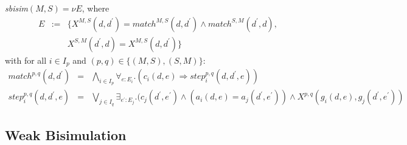 \documentclass{article}
\begin{document}
\emph{sbisim}$(M,S)=\nu E$, where%
\begin{equation*}
\begin{array}{ccl}
E & := & \{X^{M,S}(d,d^{\prime })=match^{M,S}(d,d^{\prime })\wedge
match^{S,M}(d^{\prime },d), \\
&  & X^{S,M}(d^{\prime },d)=X^{M,S}(d,d^{\prime })\}%
\end{array}%
\end{equation*}%
with for all $i\in I_{p}$ and $(p,q)\in \{(M,S),(S,M)\}$:%
\begin{eqnarray*}
match^{p,q}(d,d^{\prime }) &=&\bigwedge\limits_{i\in I_{p}}\forall
_{e:E_{i}}.(c_{i}(d,e)\Rightarrow step_{i}^{p,q}(d,d^{\prime },e)) \\
step_{i}^{p,q}(d,d^{\prime },e) &=&\bigvee\limits_{j\in I_{q}}\exists
_{e^{\prime }:E_{j}}.(c_{j}(d^{\prime },e^{\prime })\wedge
(a_{i}(d,e)=a_{j}(d^{\prime },e^{\prime }))\wedge
X^{p,q}(g_{i}(d,e),g_{j}(d^{\prime },e^{\prime }))
\end{eqnarray*}

\subsection{Weak Bisimulation}
\end{document}
